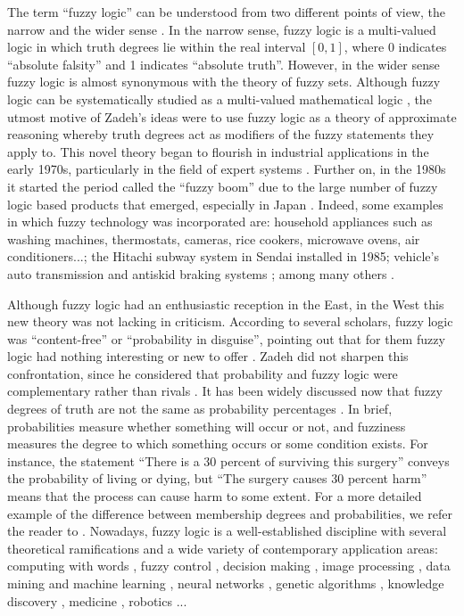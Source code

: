 The term ``fuzzy logic'' can be understood from two different points of view, the narrow and the wider sense \cite{Marks1994}. In the narrow sense, fuzzy logic is a multi-valued logic in which truth degrees lie within the real interval $[0,1]$, where $0$ indicates ``absolute falsity'' and 1 indicates ``absolute truth''. However, in the wider sense fuzzy logic is almost synonymous with the theory of fuzzy sets. Although fuzzy logic can be systematically studied as a multi-valued mathematical logic \cite{Hajek1998}, the utmost motive of Zadeh's ideas were to use fuzzy logic as a theory of approximate reasoning whereby truth degrees act as modifiers of the fuzzy statements they apply to. This novel theory began to flourish in industrial applications in the early 1970s, particularly in the field of expert systems \cite{Gaines1985}. Further on, in the 1980s it started the period called the ``fuzzy boom'' due to the large number of fuzzy logic based products that emerged, especially in Japan \cite{Seising2009,Garrido2012}. Indeed, some examples in which fuzzy technology was incorporated are: household appliances such as washing machines, thermostats, cameras, rice cookers, microwave ovens, air conditioners...; the Hitachi subway system in Sendai installed in 1985; vehicle's auto transmission and antiskid braking systems \cite{VonAltrock1994,Ivanov2015}; among many others \cite{Dutta1993}.

Although fuzzy logic had an enthusiastic reception in the East, in the West this new theory was not lacking in criticism. According to several scholars, fuzzy logic was ``content-free'' or ``probability in disguise'', pointing out that for them fuzzy logic had nothing interesting or new to offer \cite{Zadeh1996}. Zadeh did not sharpen this confrontation, since he considered that probability and fuzzy logic were complementary rather than rivals \cite{Zadeh1995}. It has been widely discussed now that fuzzy degrees of truth are not the same as probability percentages \cite{Kosko1990}. In brief, probabilities measure whether something will occur or not, and fuzziness measures the degree to which something occurs or some condition exists. For instance, the statement ``There is a 30 percent of surviving this surgery'' conveys the probability of living or dying, but ``The surgery causes 30 percent harm'' means that the process can cause harm to some extent. For a more detailed example of the difference between membership degrees and probabilities, we refer the reader to \cite{Bezdek2013}. Nowadays, fuzzy logic is a well-established discipline with several theoretical ramifications and a wide variety of contemporary application areas: computing with words \cite{Gupta2022}, fuzzy control \cite{Precup2011}, decision making \cite{Liu2020,Blanco-Mesa2017,Mardani2015}, image processing \cite{Bloch2023}, data mining and machine learning \cite{Mirzakhanov2020}, neural networks \cite{Dombi2021}, genetic algorithms \cite{Herrera2008}, knowledge discovery \cite{Ropero2011,Herrera2011,Papageorgiou2013}, medicine \cite{Uma2022}, robotics \cite{Mac2016}... 

